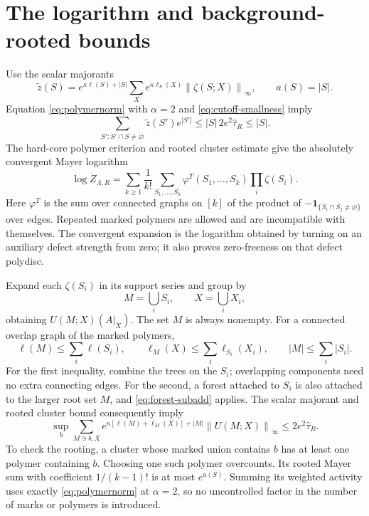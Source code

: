\documentclass[11pt]{article}
\newcommand{\one}{\mathbf 1}
\newcommand{\norm}[1]{\left\|#1\right\|}
\begin{document}
\section{The logarithm and background-rooted bounds}

Use the scalar majorants
\[
 \widetilde z(S)=e^{\kappa\ell(S)+|S|}
                 \sum_Xe^{\kappa\ell_S(X)}
                               \norm{\zeta(S;X)}_\infty,
 \qquad a(S)=|S|.
\]
Equation \eqref{eq:polymernorm} with $\alpha=2$ and
\eqref{eq:cutoff-smallness} imply
\begin{equation}
 \sum_{S':S'\cap S\ne\varnothing}\widetilde z(S')e^{|S'|}
 \le |S|\,2e^2\widehat\tau_R\le |S|.
 \label{eq:kp}
\end{equation}
The hard-core polymer criterion and rooted cluster estimate
\cite{KP} give the absolutely convergent Mayer logarithm
\begin{equation}
 \log Z_{\Lambda,R}
  =\sum_{k\ge1}\frac1{k!}\sum_{S_1,\ldots,S_k}
           \varphi^T(S_1,\ldots,S_k)\prod_i\zeta(S_i).
 \label{eq:mayer}
\end{equation}
Here $\varphi^T$ is the sum over connected graphs on $[k]$ of
the product of $-\one_{\{S_i\cap S_j\ne\varnothing\}}$ over edges.
Repeated marked polymers are allowed and are incompatible with
themselves. The convergent expansion is the logarithm obtained by
turning on an auxiliary defect strength from zero; it also proves
zero-freeness on that defect polydisc.

Expand each $\zeta(S_i)$ in its support series and group by
\[
 M=\bigcup_iS_i,\qquad X=\bigcup_iX_i,
\]
obtaining $U(M;X)(A|_X)$. The set $M$ is always nonempty.
For a connected overlap graph of the marked polymers,
\begin{equation}
 \ell(M)\le\sum_i\ell(S_i),\qquad
 \ell_M(X)\le\sum_i\ell_{S_i}(X_i),\qquad
 |M|\le\sum_i|S_i|.
 \label{eq:unionweights}
\end{equation}
For the first inequality, combine the trees on the $S_i$;
overlapping components need no extra connecting edges.
For the second, a forest attached to $S_i$ is also attached to
the larger root set $M$, and \eqref{eq:forest-subadd} applies.
The scalar majorant and rooted cluster bound consequently imply
\begin{equation}
 \sup_b\sum_{M\ni b,X}
      e^{\kappa[\ell(M)+\ell_M(X)]+|M|}
                      \norm{U(M;X)}_\infty
      \le2e^2\widehat\tau_R.
 \label{eq:markedlogbound}
\end{equation}
To check the rooting, a cluster whose marked union contains $b$
has at least one polymer containing $b$. Choosing one such polymer
overcounts. Its rooted Mayer sum with coefficient $1/(k-1)!$
is at most $e^{a(S)}$. Summing its weighted activity uses exactly
\eqref{eq:polymernorm} at $\alpha=2$, so no uncontrolled factor
in the number of marks or polymers is introduced.
\end{document}
